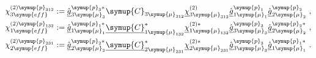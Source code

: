 \begin{subequations} \label{eq:2-209}
	\abovedisplayskip=13pt
	\belowdisplayskip=13pt
	\begin{align}
		\chi^{(2)\symup{p}_{312}}_{3\symup{eff}} &:= \hat{\underline{g}}^{\symup{p}_{3}*}_{3{{\symup{\mu}}_{3}}} \symup{C}_{3{\symup{\mu}}_{312}} \underline{\chi}^{(2)}_{3{\symup{\mu}}_{312}} \hat{\underline{g}}^{\symup{p}_{1}}_{1{\symup{\mu}}_1} \hat{\underline{g}}^{\symup{p}_{2}}_{2{\symup{\mu}}_2} \label{eq:2-209a}~, \\ {\chi}^{(2)\symup{p}_{132}}_{1\symup{eff}} &:= \hat{\underline{g}}^{\symup{p}_{1}*}_{1{\symup{\mu}}_{1}} \underline{\symup{C}}^{*}_{1{\symup{\mu}}_{132}} \underline{\chi}^{(2)*}_{1{\symup{\mu}}_{132}} \hat{\underline{g}}^{\symup{p}_{3}}_{3{\symup{\mu}}_3} \hat{\underline{g}}^{\symup{p}_{2}*}_{2{\symup{\mu}}_2} \label{eq:2-209b}~, \\ {\chi}^{(2)\symup{p}_{231}}_{2\symup{eff}} &:= \hat{\underline{g}}^{\symup{p}_{2}*}_{2{\symup{\mu}}_{2}} \underline{\symup{C}}^{*}_{2{\symup{\mu}}_{231}} \underline{\chi}^{(2)*}_{2{\symup{\mu}}_{231}} \hat{\underline{g}}^{\symup{p}_{3}}_{3{\symup{\mu}}_3} \hat{\underline{g}}^{\symup{p}_{1}*}_{1{\symup{\mu}}_1} \label{eq:2-209c}~.
	\end{align}
\end{subequations}

